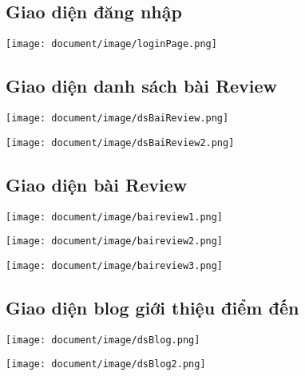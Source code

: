 \subsection{Giao diện đăng nhập}
\begin{center}
  \captionsetup{type=figure}
  \texttt{[image: document/image/loginPage.png]}
\end{center}

\subsection{Giao diện danh sách bài Review}
\begin{center}
    \texttt{[image: document/image/dsBaiReview.png]}
\end{center}
\clearpage
\begin{center}
  \captionsetup{type=figure}
  \texttt{[image: document/image/dsBaiReview2.png]}
\end{center}
\clearpage

\subsection{Giao diện bài Review}
\begin{center}
    \texttt{[image: document/image/baireview1.png]}
\end{center}
\clearpage
\begin{center}
    \texttt{[image: document/image/baireview2.png]}
\end{center}
\clearpage
\begin{center}
  \captionsetup{type=figure}
  \texttt{[image: document/image/baireview3.png]}
\end{center}
\clearpage

\subsection{Giao diện blog giới thiệu điểm đến}
\begin{center}
    \texttt{[image: document/image/dsBlog.png]}
\end{center}
\begin{center}
  \captionsetup{type=figure}
  \texttt{[image: document/image/dsBlog2.png]}
\end{center}
\clearpage

